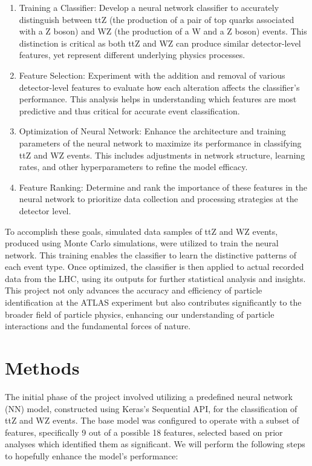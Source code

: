 \documentclass[]{article}
\begin{document}
\begin{enumerate}
 \item Training a Classifier: Develop a neural network classifier to accurately distinguish between ttZ (the production of a pair of top quarks associated with a Z boson) and WZ (the production of a W and a Z boson) events. This distinction is critical as both ttZ and WZ can produce similar detector-level features, yet represent different underlying physics processes.
\item Feature Selection: Experiment with the addition and removal of various detector-level features to evaluate how each alteration affects the classifier's performance. This analysis helps in understanding which features are most predictive and thus critical for accurate event classification.
 \item Optimization of Neural Network: Enhance the architecture and training parameters of the neural network to maximize its performance in classifying ttZ and WZ events. This includes adjustments in network structure, learning rates, and other hyperparameters to refine the model efficacy.
 \item Feature Ranking: Determine and rank the importance of these features in the neural network to prioritize data collection and processing strategies at the detector level.

\end{enumerate}
To accomplish these goals, simulated data samples of ttZ and WZ events, produced using Monte Carlo simulations, were utilized to train the neural network. This training enables the classifier to learn the distinctive patterns of each event type. Once optimized, the classifier is then applied to actual recorded data from the LHC, using its outputs for further statistical analysis and insights. This project not only advances the accuracy and efficiency of particle identification at the ATLAS experiment but also contributes significantly to the broader field of particle physics, enhancing our understanding of particle interactions and the fundamental forces of nature.

\clearpage
\section{Methods}

The initial phase of the project involved utilizing a predefined neural network (NN) model, constructed using Keras's Sequential API, for the classification of ttZ and WZ events. The base model was configured to operate with a subset of features, specifically 9 out of a possible 18 features, selected based on prior analyses which identified them as significant. 
We will perform the following steps to hopefully enhance the model's performance:
\end{document}
